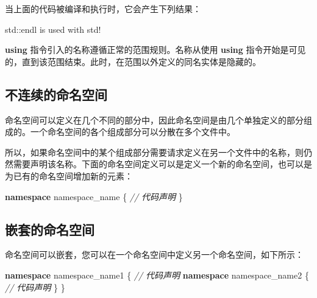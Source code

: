 \documentclass[
]{article}
\newenvironment{Shaded}{}{}
\newcommand{\BuiltInTok}[1]{#1}
\newcommand{\CommentTok}[1]{\textcolor[rgb]{0.38,0.63,0.69}{\textit{#1}}}
\newcommand{\KeywordTok}[1]{\textcolor[rgb]{0.00,0.44,0.13}{\textbf{#1}}}
\newcommand{\NormalTok}[1]{#1}
\newcommand{\OperatorTok}[1]{\textcolor[rgb]{0.40,0.40,0.40}{#1}}
\begin{document}
当上面的代码被编译和执行时，它会产生下列结果：

\begin{Shaded}
\begin{Highlighting}[]
\BuiltInTok{std::}\NormalTok{endl}\OperatorTok{ }\NormalTok{is used with std}\OperatorTok{!}
\end{Highlighting}
\end{Shaded}

\textbf{using} 指令引入的名称遵循正常的范围规则。名称从使用
\textbf{using}
指令开始是可见的，直到该范围结束。此时，在范围以外定义的同名实体是隐藏的。

\hypertarget{ux4e0dux8fdeux7eedux7684ux547dux540dux7a7aux95f4}{%
\subsection{不连续的命名空间}\label{ux4e0dux8fdeux7eedux7684ux547dux540dux7a7aux95f4}}

命名空间可以定义在几个不同的部分中，因此命名空间是由几个单独定义的部分组成的。一个命名空间的各个组成部分可以分散在多个文件中。

所以，如果命名空间中的某个组成部分需要请求定义在另一个文件中的名称，则仍然需要声明该名称。下面的命名空间定义可以是定义一个新的命名空间，也可以是为已有的命名空间增加新的元素：

\begin{Shaded}
\begin{Highlighting}[]
\KeywordTok{namespace}\NormalTok{ namespace\_name }\OperatorTok{\{}
   \CommentTok{// 代码声明}
\OperatorTok{\}}
\end{Highlighting}
\end{Shaded}

\hypertarget{ux5d4cux5957ux7684ux547dux540dux7a7aux95f4}{%
\subsection{嵌套的命名空间}\label{ux5d4cux5957ux7684ux547dux540dux7a7aux95f4}}

命名空间可以嵌套，您可以在一个命名空间中定义另一个命名空间，如下所示：

\begin{Shaded}
\begin{Highlighting}[]
\KeywordTok{namespace}\NormalTok{ namespace\_name1 }\OperatorTok{\{}
   \CommentTok{// 代码声明}
   \KeywordTok{namespace}\NormalTok{ namespace\_name2 }\OperatorTok{\{}
      \CommentTok{// 代码声明}
   \OperatorTok{\}}
\OperatorTok{\}}
\end{Highlighting}
\end{Shaded}
\end{document}
